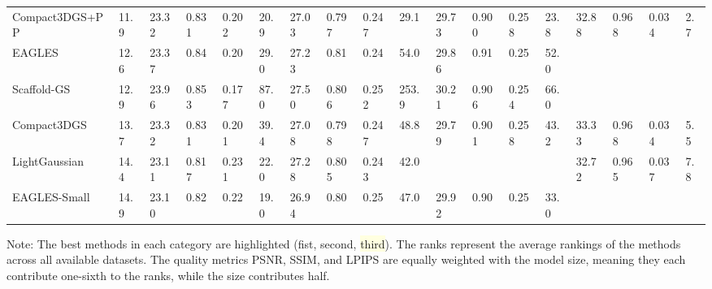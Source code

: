 {\begin{minipage}{\textheight}
\begin{adjustbox}{center}
\begin{tabular}{ll|llll|llll|llll|llll}
Compact3DGS+PP & 11.9 & 23.32 & 0.831 & 0.202 & 20.9 & 27.03 & 0.797 & 0.247 & 29.1 & 29.73 & 0.900 & 0.258 & 23.8 & 32.88 & \cellcolor{lightyellow}0.968 & \cellcolor{lightyellow}0.034 & 2.7 \\
EAGLES & 12.6 & 23.37 & 0.84 & 0.20 & 29.0 & 27.23 & \cellcolor{lightyellow}0.81 & 0.24 & 54.0 & 29.86 & \cellcolor{lightorange}0.91 & \cellcolor{lightorange}0.25 & 52.0 &  &  &  &  \\
Scaffold-GS & 12.9 & 23.96 & \cellcolor{lightorange}0.853 & \cellcolor{lightorange}0.177 & 87.0 & 27.50 & 0.806 & 0.252 & 253.9 & 30.21 & 0.906 & 0.254 & 66.0 &  &  &  &  \\
Compact3DGS & 13.7 & 23.32 & 0.831 & 0.201 & 39.4 & 27.08 & 0.798 & 0.247 & 48.8 & 29.79 & 0.901 & 0.258 & 43.2 & 33.33 & \cellcolor{lightyellow}0.968 & \cellcolor{lightyellow}0.034 & 5.5 \\
LightGaussian & 14.4 & 23.11 & 0.817 & 0.231 & 22.0 & 27.28 & 0.805 & 0.243 & 42.0 &  &  &  &  & 32.72 & 0.965 & 0.037 & 7.8 \\
EAGLES-Small & 14.9 & 23.10 & 0.82 & 0.22 & 19.0 & 26.94 & 0.80 & 0.25 & 47.0 & 29.92 & 0.90 & \cellcolor{lightorange}0.25 & 33.0 &  &  &  &  \\
\bottomrule
\end{tabular}
        \end{adjustbox}
        \newline\newline
        \noindent Note: The best methods in each category are highlighted (\colorbox{lightred}{fist}, \colorbox{lightorange}{second}, \colorbox{lightyellow}{third}). The ranks represent the average rankings of the methods across all available datasets. The quality metrics PSNR, SSIM, and LPIPS are equally weighted with the model size, meaning they each contribute one-sixth to the ranks, while the size contributes half.

    \end{minipage}
}